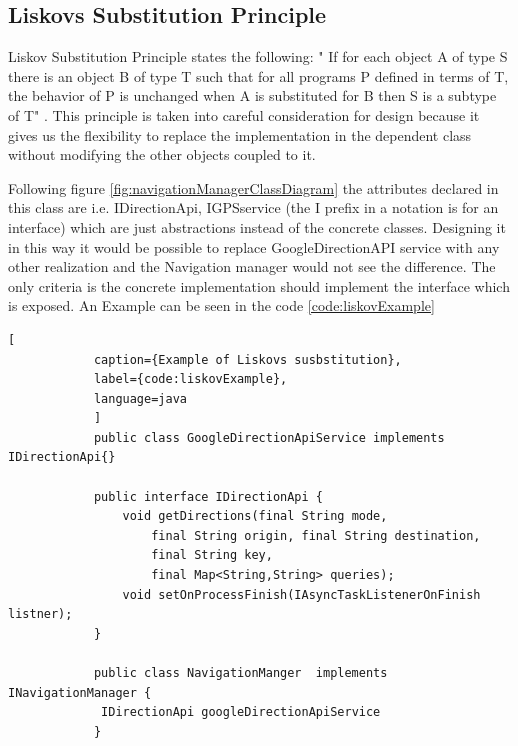 \subsection{Liskovs Substitution Principle}
    Liskov Substitution Principle states the following: " If for each object A of type S
    there is an object B of type T such that for all programs P defined in terms of T,
    the behavior of P is unchanged when A is substituted for B then S is a subtype of T"  
    \cite{Hotop2015}. This principle is taken into careful consideration for design 
    because it gives us the flexibility to replace the implementation in the dependent 
    class without modifying the other objects coupled to it. 
    \par
        Following figure \ref{fig:navigationManagerClassDiagram} the attributes declared
        in this class are i.e. IDirectionApi, IGPSservice (the I prefix in a notation is for
        an interface) which are just abstractions instead of the concrete classes.
        Designing it in this way it would be possible to replace GoogleDirectionAPI service
        with any other realization and the Navigation manager would not see the difference.
        The only criteria is the concrete implementation should implement the interface
        which is exposed. An Example can be seen in the code \ref{code:liskovExample}

        \newpage
        \begin{lstlisting}[
            caption={Example of Liskovs susbstitution},
            label={code:liskovExample},
            language=java
            ]
            public class GoogleDirectionApiService implements IDirectionApi{}

            public interface IDirectionApi {
                void getDirections(final String mode, 
                    final String origin, final String destination, 
                    final String key, 
                    final Map<String,String> queries);
                void setOnProcessFinish(IAsyncTaskListenerOnFinish listner);
            }

            public class NavigationManger  implements INavigationManager {
             IDirectionApi googleDirectionApiService
            }
             
        \end{lstlisting} 

